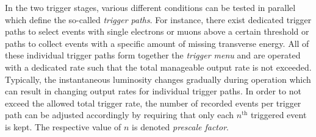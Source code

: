 In the two trigger stages, various different conditions can be tested in parallel which define the so-called \textit{trigger paths}. For instance, there exist dedicated trigger paths to select events with single electrons or muons above a certain \pt threshold or paths to collect events with a specific amount of missing transverse energy. All of these individual trigger paths form together the \textit{trigger menu} and are operated with a dedicated rate such that the total manageable output rate is not exceeded. Typically, the instantaneous luminosity changes gradually during operation which can result in changing output rates for individual trigger paths. In order to not exceed the allowed total trigger rate, the number of recorded events per trigger path can be adjusted accordingly by requiring that only each $n^\mathrm{th}$ triggered event is kept. The respective value of $n$ is denoted \textit{prescale factor}. 

